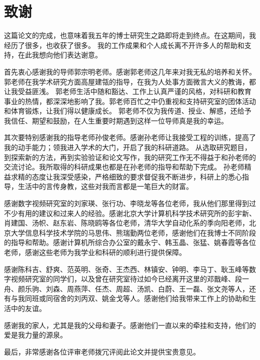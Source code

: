 \chapter{致谢}

这篇论文的完成，也意味着我五年的博士研究生之路即将走到终点。在这期间，我经历了很多，也收获了很多。
我的工作成果和个人成长离不开许多人的帮助和支持，在此我想向他们表达谢意。

首先衷心感谢我的导师郭宗明老师。感谢郭老师这几年来对我无私的培养和关怀。郭老师在我学术研究方面高屋建瓴的指导，在我为人处事方面微言大义的教诲，都让我受益匪浅。
郭老师生活中随和豁达、工作上认真严谨的风格，对科研和教育事业的热情，都深深地影响了我。郭老师百忙之中仍重视和支持研究室的团体活动和体育锻炼，让我们得以健康成长。
郭老师不仅为我传道、授业、解惑，还给予我信任、期望和鼓励，在人生重要时期遇到这样一位导师真是我的幸运。

其次要特别感谢我的指导老师孙俊老师。感谢孙老师让我接受工程的训练，提高了我的动手能力；领我进入学术的大门，开启了我的科研道路。
从选取研究题目，到探索新的方法，再到实验验证和论文写作，我的研究工作无不得益于和孙老师的交流讨论。我所取得的科研成果也都是在孙老师的指导和帮助下完成。
孙老师精益求精的态度让我深受感染，严格细致的要求督促我不断进步，科研上的悉心指导，生活中的言传身教，这些对我而言都是一笔巨大的财富。

感谢数字视频研究室的刘家瑛、张行功、李晓龙等各位老师，我从他们那里得到过不少有用的建议和过来人的经验。感谢北京大学计算机科学技术研究所的彭宇新、肖建国、汤帜、赵东岩、陈晓鸥等各位老师，清华大学自动化系的季向阳老师，北京大学信息科学技术学院的马思伟、熊瑞勤两位老师，感谢他们在我博士不同阶段的指导和帮助。感谢计算机所综合办公室的戴永宁、韩玉晶、张猛、姚春霞等各位老师，感谢这些老师为我学业和科研的顺利进行提供保障。

感谢陈科吉、舒爽、范英明、张奇、王杰西、林镇安、钟明、李马丁、耿玉峰等数字视频研究室的同学们，以及曾在研究室待过如今已经离开这里的邓戬峰、段一舟、颜乐驹、刘森、周燕萍、任杰、周超、汤凯、白蔚、王一磊、张文尧等人，还有与我同班或同宿舍的刘丙双、姚金戈等人。感谢他们给我带来工作上的协助和生活中的友谊。

感谢我的家人，尤其是我的父母和妻子。感谢他们一直以来的牵挂和支持，他们的爱是我力量的源泉。

最后，非常感谢各位评审老师拨冗评阅此论文并提供宝贵意见。